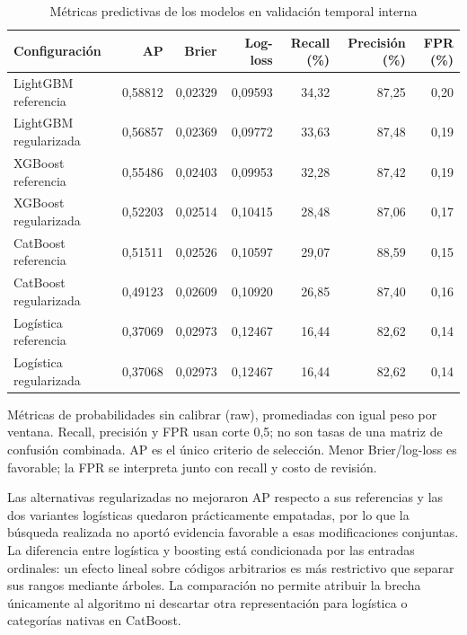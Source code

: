 \documentclass[conference,letterpaper]{IEEEtran}
\begin{document}
\begin{table}[t]
\caption{Métricas predictivas de los modelos en validación temporal interna}
\label{tab:models}\centering\small
\begin{tabular}{lrrrrrr}\toprule
Configuración & AP & Brier & Log-loss & Recall (\%) & Precisión (\%) & FPR (\%)\\\midrule
LightGBM referencia & 0,58812 & 0,02329 & 0,09593 & 34,32 & 87,25 & 0,20 \\
LightGBM regularizada & 0,56857 & 0,02369 & 0,09772 & 33,63 & 87,48 & 0,19 \\
XGBoost referencia & 0,55486 & 0,02403 & 0,09953 & 32,28 & 87,42 & 0,19 \\
XGBoost regularizada & 0,52203 & 0,02514 & 0,10415 & 28,48 & 87,06 & 0,17 \\
CatBoost referencia & 0,51511 & 0,02526 & 0,10597 & 29,07 & 88,59 & 0,15 \\
CatBoost regularizada & 0,49123 & 0,02609 & 0,10920 & 26,85 & 87,40 & 0,16 \\
Logística referencia & 0,37069 & 0,02973 & 0,12467 & 16,44 & 82,62 & 0,14 \\
Logística regularizada & 0,37068 & 0,02973 & 0,12467 & 16,44 & 82,62 & 0,14 \\
\bottomrule\end{tabular}
\par\vspace{2pt}\begin{minipage}{.95\textwidth}\footnotesize
Métricas de probabilidades sin calibrar (raw), promediadas con igual peso por ventana. Recall, precisión y FPR usan corte 0,5; no son tasas de una matriz de confusión combinada. AP es el único criterio de selección. Menor Brier/log-loss es favorable; la FPR se interpreta junto con recall y costo de revisión.
\end{minipage}
\end{table}

Las alternativas regularizadas no mejoraron AP respecto a sus referencias y las dos variantes logísticas quedaron prácticamente empatadas, por lo que la búsqueda realizada no aportó evidencia favorable a esas modificaciones conjuntas. La diferencia entre logística y boosting está condicionada por las entradas ordinales: un efecto lineal sobre códigos arbitrarios es más restrictivo que separar sus rangos mediante árboles. La comparación no permite atribuir la brecha únicamente al algoritmo ni descartar otra representación para logística o categorías nativas en CatBoost.
\end{document}

